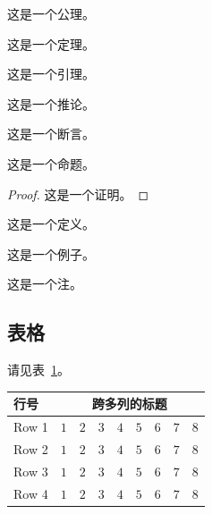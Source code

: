 \begin{axiom}
    这是一个公理。
\end{axiom}
\begin{theorem}
    这是一个定理。
\end{theorem}
\begin{lemma}
    这是一个引理。
\end{lemma}
\begin{corollary}
    这是一个推论。
\end{corollary}
\begin{assertion}
    这是一个断言。
\end{assertion}
\begin{proposition}
    这是一个命题。
\end{proposition}
\begin{proof}
    这是一个证明。
\end{proof}
\begin{definition}
    这是一个定义。
\end{definition}
\begin{example}
    这是一个例子。
\end{example}
\begin{remark}
    这是一个注。
\end{remark}

\subsection{表格}

请见表~\ref{tab:sample}。
\begin{table}[!htbp]
    \label{tab:sample}
    \centering
    \footnotesize%
    \setlength{\tabcolsep}{4pt}%
    \renewcommand{\arraystretch}{1.2}%
    \begin{tabular}{lcccccccc}
        \hline
        行号 & \multicolumn{8}{c}{跨多列的标题} \\
        \hline
        Row 1 & $1$ & $2$ & $3$ & $4$ & $5$ & $6$ & $7$ & $8$ \\
        Row 2 & $1$ & $2$ & $3$ & $4$ & $5$ & $6$ & $7$ & $8$ \\
        Row 3 & $1$ & $2$ & $3$ & $4$ & $5$ & $6$ & $7$ & $8$ \\
        Row 4 & $1$ & $2$ & $3$ & $4$ & $5$ & $6$ & $7$ & $8$ \\
        \hline
    \end{tabular}
\end{table}

